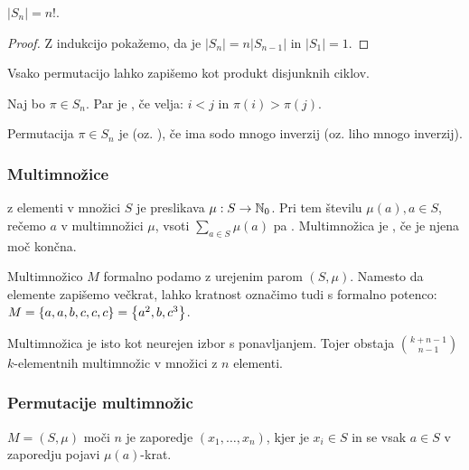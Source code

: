 \begin{trditev}
    $|S_n| = n!$.
\end{trditev}

\begin{proof}
    Z indukcijo pokažemo, da je $|S_n| = n|S_{n-1}|$ in $|S_1| = 1$.
\end{proof}

\begin{trditev}
    Vsako permutacijo lahko zapišemo kot produkt disjunknih ciklov.
\end{trditev}

\begin{definicija}
    Naj bo $\pi \in S_n$. Par je , če velja: $i < j$ in $\pi(i) > \pi(j)$.
\end{definicija}

\begin{definicija}
    Permutacija $\pi \in S_n$ je  (oz. ), če ima sodo mnogo inverzij (oz. liho mnogo inverzij).
\end{definicija}

\subsubsection{Multimnožice}
\begin{definicija}
     z elementi v množici $S$ je preslikava $\mu: S \to \mathbb{N}_0$. Pri tem številu $\mu(a), a \in S$, rečemo  $a$ v multimnožici $\mu$, vsoti $\sum_{a \in S} \mu(a)$ pa . Multimnožica je , če je njena moč končna.
\end{definicija}

\begin{opomba}
    Multimnožico $M$ formalno podamo z urejenim parom $(S, \mu)$. Namesto da elemente zapišemo večkrat, lahko kratnost označimo tudi s formalno potenco: $M = \left\{a, a, b, c, c, c\right\} = \left\{a^2, b, c^3\right\}$.

    Multimnožica je isto kot neurejen izbor s ponavljanjem. Tojer obstaja $\binom{k+n-1}{n-1}$ $k$-elementnih multimnožic v množici z $n$ elementi.
\end{opomba}

\subsubsection{Permutacije multimnožic}
\begin{definicija}
     $M = (S, \mu)$ moči $n$ je zaporedje $(x_1, \ldots, x_n)$, kjer je $x_i \in S$ in se vsak $a \in S$ v zaporedju pojavi $\mu(a)$-krat.
\end{definicija}


